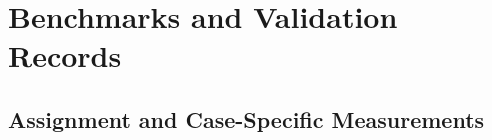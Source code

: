 
\section{Benchmarks and Validation Records}
\subsection{Assignment and Case-Specific Measurements}



